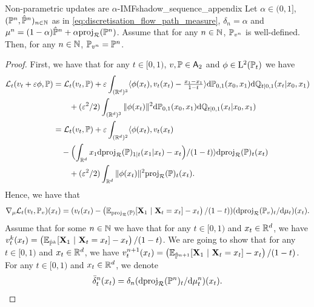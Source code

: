 \documentclass{article}
\begin{document}
\begin{proposition}{Non-parametric updates are $\alpha$-IMF}{shadow_sequence_appendix}
Let $\alpha \in (0,1]$, $(\mathbb{P}^n, \hat{\mathbb{P}}^n)_{n \in \mathbb{N}}$ as in \eqref{eq:discretisation_flow_path_measure}, $\delta_n =  \alpha$ and $\mu^n = (1-\alpha) \hat{\mathbb{P}}^n + \alpha \mathrm{proj}_{\mathcal{R}}(\mathbb{P}^n)$. Assume that for any $n \in \mathbb{N}$, $\mathbb{P}_{v^n}$ is well-defined. Then, for any $n \in \mathbb{N}$,  $\mathbb{P}_{v^n} = \mathbb{P}^n$.
\end{proposition}
\begin{proof}
First, we have that for any $t \in [0,1)$, $v, \mathbb{P} \in \mathsf{A}_2$ and $\phi \in \mathrm{L}^2(\mathbb{P}_t)$ we have 
 \begin{align}
     \mathcal{L}_t(v_t + \varepsilon \phi,\mathbb{P}) &= \mathcal{L}_t(v_t,\mathbb{P}) + \varepsilon \int_{(\mathbb{R}^d)^3} \langle \phi(x_t), v_t(x_t) - \tfrac{x_1 - x_1}{1-t}\rangle \mathrm{d} \mathbb{P}_{0,1}(x_0,x_1) \mathrm{d} \mathbb{Q}_{t|0,1}(x_t|x_0, x_1) \\
     &  \qquad + (\varepsilon^2/2) \int_{(\mathbb{R}^d)^3} \| \phi(x_t) \|^2 \mathrm{d} \mathbb{P}_{0,1}(x_0,x_1) \mathrm{d} \mathbb{Q}_{t|0,1}(x_t|x_0, x_1) \\ 
     &= \mathcal{L}_t(v_t,\mathbb{P}) + \varepsilon \int_{(\mathbb{R}^d)^2} \langle \phi(x_t), v_t(x_t) \\
     & \quad - \Bigl(\int_{\mathbb{R}^d} x_1 \mathrm{d} \mathrm{proj}_{\mathcal{R}}(\mathbb{P})_{1|t}(x_1 | x_t) - x_t\Bigr)/(1-t) \rangle \mathrm{d} \mathrm{proj}_{\mathcal{R}}(\mathbb{P})_t(x_t) \\
     &  \qquad + (\varepsilon^2/2) \int_{\mathbb{R}^d} \| \phi(x_t) \|^2 \mathrm{proj}_{\mathcal{R}}(\mathbb{P})_t(x_t) . 
 \end{align}
Hence, we have that 
\begin{equation}
\label{eq:functional_derivative_loss}
    \nabla_{\mu} \Lnonparam_t(v_t,\Pbb_v)(x_t) = (v_t(x_t) - \left(\mathbb{E}_{\projsimpleR(\Pbb)}[ \bfX_1 \ | \ \bfX_t = x_t] - x_t\right)/(1-t)) (\rmd \projsimpleR(\Pbb_v)_t / \rmd \mu_t)(x_t) . 
\end{equation}
Assume that for some $n \in \mathbb{N}$ we have that for any $t \in [0,1)$ and $x_t \in \mathbb{R}^d$, we have  $v^k_t(x_t) = \left(\mathbb{E}_{\hat{\mathbb{P}}^k}[\mathbf{X}_1 \ | \ \mathbf{X}_t = x_t] - x_t\right) / (1-t)$. We are going to show that for any $t \in [0,1)$ and $x_t \in \mathbb{R}^d$, we have  $v^{n+1}_t(x_t) = \left(\mathbb{E}_{\hat{\mathbb{P}}^{n+1}}[\mathbf{X}_1 \ | \ \mathbf{X}_t = x_t] - x_t\right) / (1-t)$. For any $t \in [0,1)$ and $x_t \in \mathbb{R}^d$, we denote 
\begin{equation}
    \bar{\delta}^n_t(x_t) = \delta_n (\mathrm{d} \mathrm{proj}_{\mathcal{R}}(\mathbb{P}^n)_t / \mathrm{d} \mu_t^n)(x_t) . 
\end{equation}

\end{proof}
\end{document}
